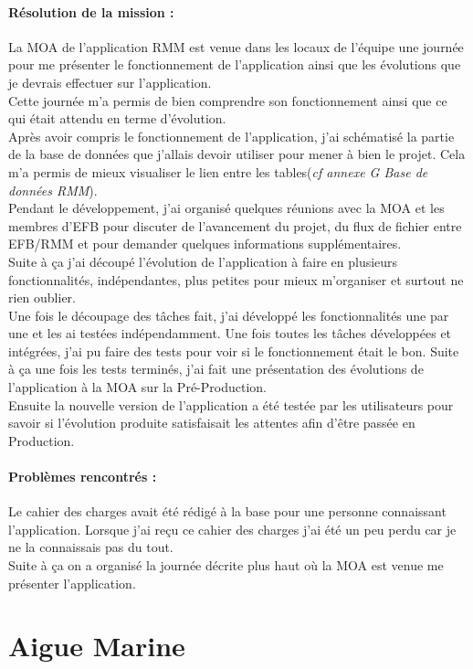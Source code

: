 \documentclass[a4paper,twoside,12pt]{report}
\begin{document}
\paragraph {Résolution de la mission :} 
La MOA de l'application RMM est venue dans les locaux de l'équipe une journée pour me présenter le fonctionnement de l'application ainsi que les évolutions que je devrais effectuer sur l'application.\\
Cette journée m'a permis de bien comprendre son fonctionnement ainsi que ce qui était attendu en terme d'évolution.\\
Après avoir compris le fonctionnement de l'application, j'ai schématisé la partie de la base de données que j'allais devoir utiliser pour mener à bien le projet. Cela m'a permis de mieux visualiser le lien entre les tables(\emph{cf annexe G Base de données RMM}).\\
Pendant le développement, j'ai organisé quelques réunions avec la MOA et les membres d'EFB pour discuter de l'avancement du projet, du flux de fichier entre EFB/RMM et pour demander quelques informations supplémentaires.\\
Suite à ça j'ai découpé l'évolution de l'application à faire en plusieurs fonctionnalités, indépendantes, plus petites pour mieux m'organiser et surtout ne rien oublier.\\
Une fois le découpage des tâches fait, j'ai développé les fonctionnalités une par une et les ai testées indépendamment. Une fois toutes les tâches développées et intégrées, j'ai pu faire des tests pour voir si le fonctionnement était le bon.
Suite à ça une fois les tests terminés, j'ai fait une présentation des évolutions de l'application à la MOA sur la Pré-Production.\\
Ensuite la nouvelle version de l'application a été testée par les utilisateurs pour savoir si l'évolution produite satisfaisait les attentes afin d'être passée en Production.
\paragraph {Problèmes rencontrés :}
Le cahier des charges avait été rédigé à la base pour une personne connaissant l'application. Lorsque j'ai reçu ce cahier des charges j'ai été un peu perdu car je ne la connaissais pas du tout.\\
Suite à ça on a organisé la journée décrite plus haut où la MOA est venue me présenter l'application.
\newpage
\section{Aigue Marine}
\vspace{1cm}
\end{document}
